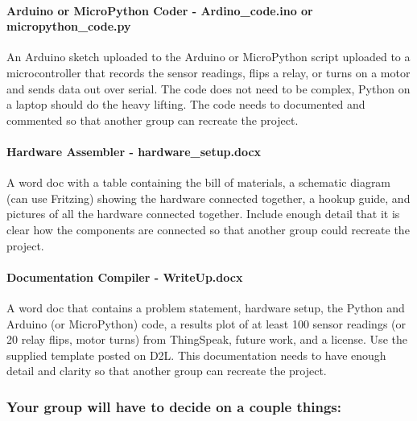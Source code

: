 \documentclass[11pt]{article}
\begin{document}
\hypertarget{arduino-or-micropython-coder---ardino_code.ino-or-micropython_code.py}{%
\paragraph{Arduino or MicroPython Coder - Ardino\_code.ino or
micropython\_code.py}\label{arduino-or-micropython-coder---ardino_code.ino-or-micropython_code.py}}

An Arduino sketch uploaded to the Arduino or MicroPython script uploaded
to a microcontroller that records the sensor readings, flips a relay, or
turns on a motor and sends data out over serial. The code does not need
to be complex, Python on a laptop should do the heavy lifting. The code
needs to documented and commented so that another group can recreate the
project.

\hypertarget{hardware-assembler---hardware_setup.docx}{%
\paragraph{Hardware Assembler -
hardware\_setup.docx}\label{hardware-assembler---hardware_setup.docx}}

A word doc with a table containing the bill of materials, a schematic
diagram (can use Fritzing) showing the hardware connected together, a
hookup guide, and pictures of all the hardware connected together.
Include enough detail that it is clear how the components are connected
so that another group could recreate the project.

\hypertarget{documentation-compiler---writeup.docx}{%
\paragraph{Documentation Compiler -
WriteUp.docx}\label{documentation-compiler---writeup.docx}}

A word doc that contains a problem statement, hardware setup, the Python
and Arduino (or MicroPython) code, a results plot of at least 100 sensor
readings (or 20 relay flips, motor turns) from ThingSpeak, future work,
and a license. Use the supplied template posted on D2L. This
documentation needs to have enough detail and clarity so that another
group can recreate the project.

    \hypertarget{your-group-will-have-to-decide-on-a-couple-things}{%
\subsubsection{Your group will have to decide on a couple
things:}\label{your-group-will-have-to-decide-on-a-couple-things}}
\end{document}
